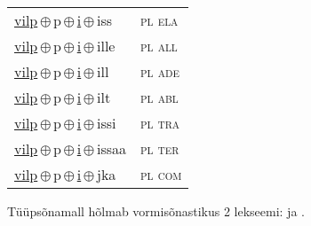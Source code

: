 \begin{minipage}{\textwidth}
\begin{sideways}
\begin{tabular}{l l}
\underline{vilp}\,$\oplus$\,p\,$\oplus$\,\underline{i}\,$\oplus$\,iss & \textsc{ pl ela } \\
\underline{vilp}\,$\oplus$\,p\,$\oplus$\,\underline{i}\,$\oplus$\,ille & \textsc{ pl all } \\
\underline{vilp}\,$\oplus$\,p\,$\oplus$\,\underline{i}\,$\oplus$\,ill & \textsc{ pl ade } \\
\underline{vilp}\,$\oplus$\,p\,$\oplus$\,\underline{i}\,$\oplus$\,ilt & \textsc{ pl abl } \\
\underline{vilp}\,$\oplus$\,p\,$\oplus$\,\underline{i}\,$\oplus$\,issi & \textsc{ pl tra } \\
\underline{vilp}\,$\oplus$\,p\,$\oplus$\,\underline{i}\,$\oplus$\,issaa & \textsc{ pl ter } \\
\underline{vilp}\,$\oplus$\,p\,$\oplus$\,\underline{i}\,$\oplus$\,jka & \textsc{ pl com } \\
\end{tabular}
\end{sideways}
\label{tab:tüüpsõnamall-vilppi}

\end{minipage}

 
\vspace{1em}
\noindent Tüüpsõnamall  hõlmab vormisõnastikus 2 lekseemi:  ja .

